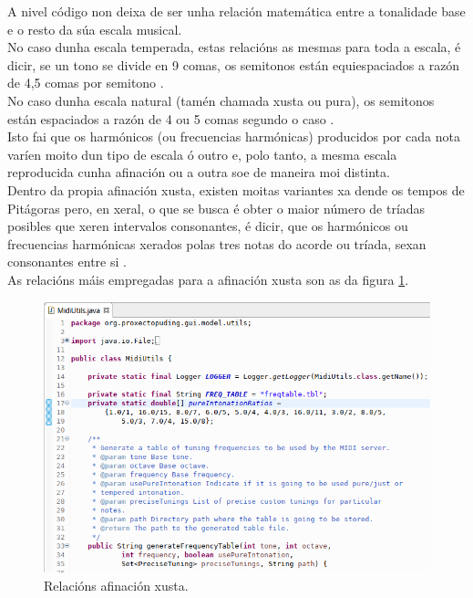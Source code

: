    A nivel código non deixa de ser unha relación matemática entre a tonalidade
   base e o resto da súa escala musical. \\
   
   No caso dunha escala temperada, estas relacións as mesmas para toda a escala,
   é dicir, se un tono se divide en 9 comas, os semitonos están equiespaciados a
   razón de 4,5 comas por semitono \cite{AfinacionTemperada}. \\
   
   No caso dunha escala natural (tamén chamada xusta ou pura), os semitonos
   están espaciados a razón de 4 ou 5 comas segundo o caso
   \cite{AfinacionNatural}. \\
   
   Isto fai que os harmónicos (ou frecuencias harmónicas) producidos por cada
   nota varíen moito dun tipo de escala ó outro e, polo tanto, a mesma escala
   reproducida cunha afinación ou a outra soe de maneira moi distinta. \\
   
   Dentro da propia afinación xusta, existen moitas variantes xa dende os tempos
   de Pitágoras pero, en xeral, o que se busca é obter o maior número de tríadas
   posibles que xeren intervalos consonantes, é dicir, que os harmónicos ou
   frecuencias harmónicas xerados polas tres notas do acorde ou tríada, sexan
   consonantes entre si \cite{Escalas}. \\
   
   As relacións máis empregadas para a afinación xusta son as da figura
   \ref{figura:AfinacionNatural}. \\
   
   \begin{figure}[htbp]
    \centering
    \includegraphics[scale=0.6, keepaspectratio=true]{./imagenes/afinacion-natural.png}
    \caption{Relacións afinación xusta.}
    \label{figura:AfinacionNatural}
   \end{figure}
   
